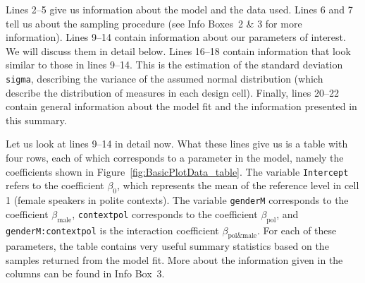\documentclass[nobib]{tufte-handout}
\begin{document}
Lines 2--5 give us information about the model and the data used. Lines 6 and 7 tell us about
the sampling procedure (see Info Boxes~2 \& 3 for more information). Lines 9--14 contain information about our
parameters of interest. We will discuss them in detail below. Lines 16--18 contain information
that look similar to those in lines 9--14. This is the estimation of the standard deviation
\texttt{sigma}, describing the variance of the assumed normal distribution (which describe the
distribution of measures in each design cell). Finally, lines 20--22 contain general
information about the model fit and the information presented in this summary.

Let us look at lines 9--14 in detail now. What these lines give us is a table with four rows, each of which corresponds to a parameter in the model, namely the coefficients shown in Figure~\ref{fig:BasicPlotData_table}. The variable \texttt{Intercept} refers to the coefficient $\beta_0$, which represents the mean of the reference level in cell 1 (female speakers in polite contexts). The variable \texttt{genderM} corresponds to the coefficient $\beta_{\text{male}}$, \texttt{contextpol} corresponds to the coefficient $\beta_{\text{pol}}$, and \texttt{genderM:contextpol} is the interaction coefficient $\beta_{\text{pol\&male}}$. For each of these parameters, the table contains very useful summary statistics based on the samples returned from the model fit.
%
%
More about the information given in the columns can be found in Info Box~3.
\end{document}

